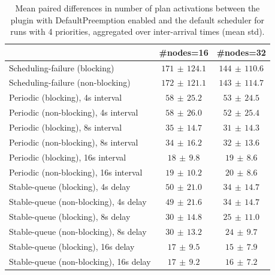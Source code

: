 \begin{table}[t]
\tiny
\setlength{\tabcolsep}{1.2pt}
\renewcommand{\arraystretch}{1.12}
\centering
\caption{Mean paired differences in number of plan activations between the plugin with DefaultPreemption enabled and the default scheduler for runs with 4 priorities, aggregated over inter-arrival times (mean \pm std).}
\label{tab:plan_activations-defpreempt1-prio4-std1-agg-arrival}
\begin{tabular}{l c c}
\toprule
 & \#nodes=16 & \#nodes=32 \\
\midrule
Scheduling-failure (blocking) & $171\,\pm\,124.1$ & $144\,\pm\,110.6$ \\
Scheduling-failure (non-blocking) & $172\,\pm\,121.1$ & $143\,\pm\,114.7$ \\
Periodic (blocking), 4s interval & $58\,\pm\,25.2$ & $53\,\pm\,24.5$ \\
Periodic (non-blocking), 4s interval & $58\,\pm\,26.0$ & $52\,\pm\,25.4$ \\
Periodic (blocking), 8s interval & $35\,\pm\,14.7$ & $31\,\pm\,14.3$ \\
Periodic (non-blocking), 8s interval & $34\,\pm\,16.2$ & $32\,\pm\,13.6$ \\
Periodic (blocking), 16s interval & $18\,\pm\,9.8$ & $19\,\pm\,8.6$ \\
Periodic (non-blocking), 16s interval & $19\,\pm\,10.2$ & $20\,\pm\,8.6$ \\
Stable-queue (blocking), 4s delay & $50\,\pm\,21.0$ & $34\,\pm\,14.7$ \\
Stable-queue (non-blocking), 4s delay & $49\,\pm\,21.6$ & $34\,\pm\,14.7$ \\
Stable-queue (blocking), 8s delay & $30\,\pm\,14.8$ & $25\,\pm\,11.0$ \\
Stable-queue (non-blocking), 8s delay & $30\,\pm\,13.2$ & $24\,\pm\,9.7$ \\
Stable-queue (blocking), 16s delay & $17\,\pm\,9.5$ & $15\,\pm\,7.9$ \\
Stable-queue (non-blocking), 16s delay & $17\,\pm\,9.2$ & $16\,\pm\,7.2$ \\
\bottomrule
\end{tabular}
\end{table}
